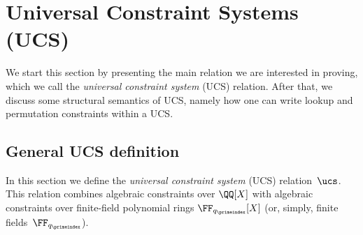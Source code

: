 \section{Universal Constraint Systems (UCS)}
We start this section by presenting the main relation we are interested in proving, which we call the \emph{universal constraint system} (UCS) relation.  After that, we discuss some structural semantics of UCS, namely how one can write lookup and permutation constraints within a UCS.

\subsection{General UCS definition}\label{s:general_ucs_definition}

In this section we define the \emph{universal constraint system} (UCS) relation~$\ucs$. This relation combines algebraic constraints over $\QQ[X]$ with algebraic constraints over finite-field polynomial rings $\FF_{q_\primeindex}[X]$ (or, simply, finite fields~$\FF_{q_\primeindex}$).


